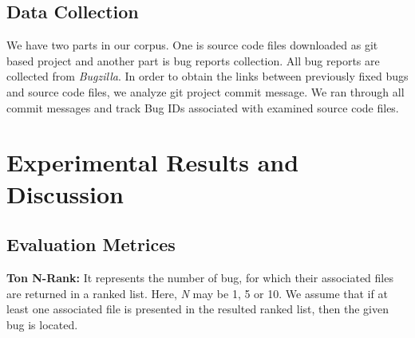 \documentclass{sig-alternate}
\begin{document}
\begin{table}[!t]
\caption{Description of Data Sets}
\label{tab:DDSl}
\centering
{}
\end{table}
\subsection{Data Collection}
We have two parts in our corpus. One is source code files downloaded as git based project and another part is bug reports collection. All bug reports are collected from \textit{Bugzilla}. In order to obtain the links between previously fixed bugs and source code files, we analyze git project commit message. We ran through all commit messages and track Bug IDs associated with examined source code files.

\section{Experimental Results and Discussion}
\subsection{Evaluation Metrices}
\textbf{Ton N-Rank:} It represents the number of bug, for which their associated files are returned in a ranked list. Here, \textit{N} may be 1, 5 or 10. We assume that if at least one associated file is presented in the resulted ranked list, then the given bug is located.
\end{document}
